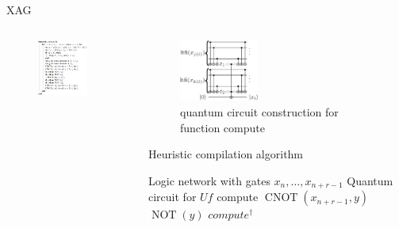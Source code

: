 \begin{frame}{XAG}
  \begin{columns}
    \begin{column}{0.48\linewidth}
      \begin{figure}[h]
        \centering
        \includegraphics[width=0.8\textwidth]{figure/function.png}
        \label{fig-function}
      \end{figure}
    \end{column}
    \begin{column}{0.48\linewidth}
      \begin{figure}[h]
        \centering
        \includegraphics[width=0.4\textwidth]{figure/construction.png}
        \caption{quantum circuit construction for function compute}
        \label{fig-construction}
      \end{figure}
      \begin{algorithm}[H]
         \scriptsize
        \caption{Heuristic compilation algorithm} 
        \label{alg-be} 
        \begin{algorithmic}
          \REQUIRE Logic network with gates $x_n, \dots, x_{n+r-1}$
          \ENSURE Quantum circuit for $Uf$
          \STATE compute
          \STATE $\operatorname{CNOT}(x_{n+r-1},y)$
          \STATE $\operatorname{NOT}(y)$
          \ENDIF
          \STATE $compute^{\dagger}$
        \end{algorithmic} 
      \end{algorithm}
    \end{column}
  \end{columns}
\end{frame}
